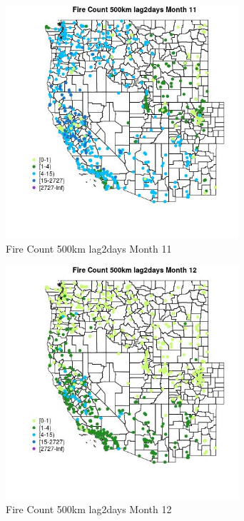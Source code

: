 \begin{figure} 
\centering  
\includegraphics[width=0.77\textwidth]{Code_Outputs/Report_ML_input_PM25_Step4_part_f_de_duplicated_aveswNAs_MapObsMo11Fire_Count_500km_lag2days.jpg} 
\caption{\label{fig:Report_ML_input_PM25_Step4_part_f_de_duplicated_aveswNAsMapObsMo11Fire_Count_500km_lag2days}Fire Count 500km lag2days Month 11} 
\end{figure} 
 

\begin{figure} 
\centering  
\includegraphics[width=0.77\textwidth]{Code_Outputs/Report_ML_input_PM25_Step4_part_f_de_duplicated_aveswNAs_MapObsMo12Fire_Count_500km_lag2days.jpg} 
\caption{\label{fig:Report_ML_input_PM25_Step4_part_f_de_duplicated_aveswNAsMapObsMo12Fire_Count_500km_lag2days}Fire Count 500km lag2days Month 12} 
\end{figure} 
 

